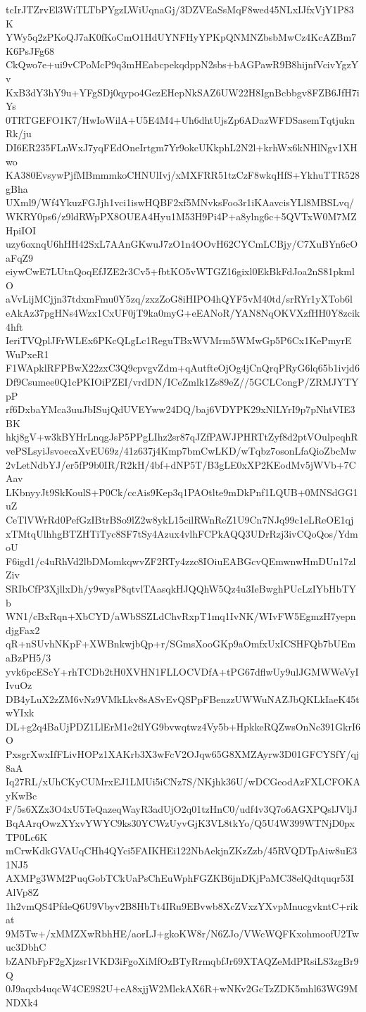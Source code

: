 tcIrJTZrvEl3WiTLTbPYgzLWiUqnaGj/3DZVEaSsMqF8wed45NLxIJfxVjY1P83K
YWy5q2zPKoQJ7aK0fKoCmO1HdUYNFHyYPKpQNMNZbsbMwCz4KcAZBm7K6PsJFg68
CkQwo7e+ui9vCPoMcP9q3mHEabcpekqdppN2sbs+bAGPawR9B8hijnfVcivYgzYv
KxB3dY3hY9u+YFgSDj0qypo4GezEHepNkSAZ6UW22H8IgnBcbbgv8FZB6JfH7iYs
0TRTGEFO1K7/HwIoWilA+U5E4M4+Uh6dhtUjsZp6ADazWFDSasemTqtjuknRk/ju
DI6ER235FLnWxJ7yqFEdOneIrtgm7Yr9okcUKkphL2N2l+krhWx6kNHlNgv1XHwo
KA380EvsywPjfMBmmmkoCHNUlIvj/xMXFRR51tzCzF8wkqHfS+YkhuTTR528gBha
UXml9/Wf4YkuzFGJjh1vci1iswHQBF2xf5MNvksFoo3r1iKAavcisYLl8MBSLvq/
WKRY0ps6/z9ldRWpPX8OUEA4Hyu1M53H9Pi4P+a8ylng6c+5QVTxW0M7MZHpiIOI
uzy6oxnqU6hHH42SxL7AAnGKwuJ7zO1n4OOvH62CYCmLCBjy/C7XuBYn6cOaFqZ9
eiywCwE7LUtnQoqEfJZE2r3Cv5+fbtKO5vWTGZ16gixl0EkBkFdJoa2nS81pkmlO
aVvLijMCjjn37tdxmFmu0Y5zq/zxzZoG8iHIPO4hQYF5vM40td/srRYr1yXTob6l
eAkAz37pgHNs4Wzx1CxUF0jT9ka0myG+eEANoR/YAN8NqOKVXzfHH0Y8zcik4hft
IeriTVQplJFrWLEx6PKcQLgLc1ReguTBxWVMrm5WMwGp5P6Cx1KePmyrEWuPxeR1
F1WApklRFPBwX22zxC3Q9cpvgvZdm+qAutfteOjOg4jCnQrqPRyG6lq65b1ivjd6
Df9Csumee0Q1cPKIOiPZEI/vrdDN/ICeZmlk1Zs89eZ//5GCLCongP/ZRMJYTYpP
rf6DxbaYMca3uuJbISujQdUVEYww24DQ/baj6VDYPK29xNlLYrI9p7pNhtVIE3BK
hkj8gV+w3kBYHrLnqgJsP5PPgLIhz2sr87qJZfPAWJPHRTtZyf8d2ptVOulpeqhR
vePSLsyiJsvoecaXvEU69z/41z637j4Kmp7bmCwLKD/wTqbz7osonLfaQioZbcMw
2vLetNdbYJ/er5fP9b0IR/R2kH/4bf+dNP5T/B3gLE0xXP2KEodMv5jWVb+7CAav
LKbnyyJt9SkKoulS+P0Ck/ccAis9Kep3q1PAOtlte9mDkPnf1LQUB+0MNSdGG1uZ
CeTlVWrRd0PefGzIBtrBSo9lZ2w8ykL15cilRWnReZ1U9Cn7NJq99c1eLReOE1qj
xTMtqUlhhgBTZHTiTyc8SF7tSy4Azux4vlhFCPkAQQ3UDrRzj3ivCQoQos/YdmoU
F6igd1/c4uRhVd2lbDMomkqwvZF2RTy4zzc8IOiuEABGcvQEmwnwHmDUn17zlZiv
SRIbCfP3XjllxDh/y9wysP8qtvlTAasqkHJQQhW5Qz4u3IeBwghPUcLzIYbHbTYb
WN1/cBxRqn+XbCYD/aWbSSZLdChvRxpT1mq1IvNK/WIvFW5EgmzH7yepndjgFax2
qR+nSUvhNKpF+XWBnkwjbQp+r/SGmsXooGKp9aOmfxUxICSHFQb7bUEmaBzPH5/3
yvk6pcEScY+rhTCDb2tH0XVHN1FLLOCVDfA+tPG67dflwUy9ulJGMWWeVyIIvuOz
DB4yLuX2zZM6vNz9VMkLkv8sASvEvQSPpFBenzzUWWuNAZJbQKLkIaeK45twYIxk
DL+g2q4BaUjPDZ1LlErM1e2tlYG9bvwqtwz4Vy5b+HpkkeRQZwsOnNc391GkrI6O
PxsgrXwxIfFLivHOPz1XAKrb3X3wFcV2OJqw65G8XMZAyrw3D01GFCYSfY/qj8aA
Iq27RL/xUhCKyCUMrxEJ1LMUi5iCNz7S/NKjhk36U/wDCGeodAzFXLCFOKAyKwBc
F/5s6XZx3O4xU5TeQazeqWayR3adUjO2q01tzHnC0/udf4v3Q7o6AGXPQslJVljJ
BqAArqOwzXYxvYWYC9ks30YCWzUyvGjK3VL8tkYo/Q5U4W399WTNjD0pxTP0Lc6K
mCrwKdkGVAUqCHh4QYci5FAIKHEi122NbAekjnZKzZzb/45RVQDTpAiw8uE31NJ5
AXMPg3WM2PuqGobTCkUaPsChEuWphFGZKB6jnDKjPaMC38elQdtquqr53IAlVp8Z
1h2vmQS4PfdeQ6U9Vbyv2B8HbTt4IRu9EBvwb8XcZVxzYXvpMnucgvkntC+rikat
9M5Tw+/xMMZXwRbhHE/aorLJ+gkoKW8r/N6ZJo/VWcWQFKxohmoofU2Twuc3DbhC
bZANbFpF2gXjzsr1VKD3iFgoXiMfOzBTyRrmqbfJr69XTAQZeMdPRsiLS3zgBr9Q
0J9aqxb4uqcW4CE9S2U+eA8xjjW2MlekAX6R+wNKv2GcTzZDK5mhl63WG9MNDXk4

